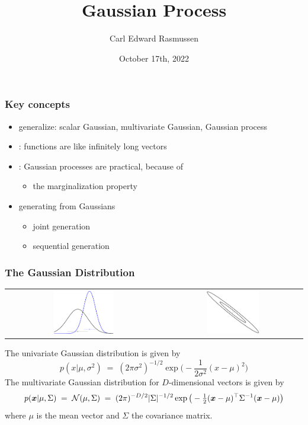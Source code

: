 

\title{Gaussian Process}
\author{Carl Edward Rasmussen}
\date{October 17th, 2022}



\begin{frame}
\titlepage
\end{frame}

\begin{frame}
\frametitle{Key concepts}
\begin{itemize}
\item generalize: scalar Gaussian, multivariate Gaussian, Gaussian process
\item {}: functions are like infinitely long vectors
\item {}: Gaussian processes are practical, because of
\begin{itemize}
\item the marginalization property
\end{itemize}
\item generating from Gaussians
\begin{itemize}
\item joint generation
\item sequential generation
\end{itemize}
\end{itemize}
\end{frame}

\begin{frame}
\frametitle{The Gaussian Distribution}
\begin{center}
\begin{tabular}{cc}
\includegraphics[width=0.4\textwidth]{gauss00} &
{\includegraphics[width=0.4\textwidth]{gauss01}}
\end{tabular}
\end{center}
The univariate Gaussian distribution is given by
\[
p(x|\mu,\sigma^2) \;=\; (2 \pi \sigma^2 )^{-1/2} \exp \big( - \frac{1}{2
  \sigma^2} (x-\mu)^2 \big)
\]
The multivariate Gaussian distribution for $D$-dimensional vectors is given by
\[
p(\bm x|\mu,\Sigma)\;=\;{\cal N}(\mu,\Sigma)\;=\;(2\pi)^{-D/2}|\Sigma|^{-1/2}
\exp\big(-\tfrac{1}{2}(\bm x-\mu)^\top\Sigma^{-1}(\bm x-\mu)\big)
\]
where $\mu$ is the mean vector and $\Sigma$ the covariance matrix.
\end{frame}


